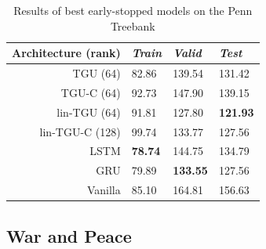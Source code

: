\begin{table}

\begin{tabu} to \textwidth {r||l|l|l}
 Architecture (rank) & \emph{Train} & \emph{Valid} & \emph{Test} \\
\hline
TGU   (64)    & 82.86 & 139.54 & 131.42 \\
TGU-C  (64)   & 92.73 & 147.90 & 139.15 \\
lin-TGU (64)  & 91.81 & 127.80 & \textbf{121.93} \\
lin-TGU-C (128) & 99.74 & 133.77 & 127.56 \\
\hline
LSTM      & \textbf{78.74} & 144.75 & 134.79 \\
GRU       & 79.89 & \textbf{133.55} & 127.56 \\
Vanilla   & 85.10 & 164.81 & 156.63 \\
\hline
\end{tabu}

\caption{Results of best early-stopped models on the Penn Treebank}
\label{tab:ptb}
\end{table}


\subsection{War and Peace}